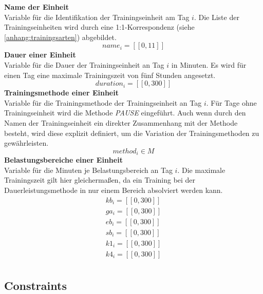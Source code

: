 \textbf{Name der Einheit} \\[0.2em]
Variable für die Identifikation der Trainingseinheit am Tag $i$. Die Liste der Trainingseinheiten wird durch eine 1:1-Korrespondenz (siehe \ref{anhang:trainingsarten}) abgebildet.
\begin{equation}
    name_i = [\![0, 11]\!]
\end{equation}
\textbf{Dauer einer Einheit} \\[0.2em]
Variable für die Dauer der Trainingseinheit an Tag $i$ in Minuten. Es wird für einen Tag eine maximale Trainingszeit von fünf Stunden angesetzt.
\begin{equation} 
    duration_i = [\![0, 300]\!] \end{equation} 
\textbf{Trainingsmethode einer Einheit} \\[0.2em]
Variable für die Trainingsmethode der Trainingseinheit an Tag $i$. Für Tage ohne Trainingseinheit wird die Methode \textit{PAUSE} eingeführt. Auch wenn durch den Namen der Trainingseinheit ein direkter Zusammenhang mit der Methode besteht, wird diese explizit definiert, um die Variation der Trainingsmethoden zu gewährleisten.
\begin{equation}
    method_i \in M
\end{equation} 
\textbf{Belastungsbereiche einer Einheit} \\[0.2em]
Variable für die Minuten je Belastungsbereich an Tag $i$. Die maximale Trainingszeit gilt hier gleichermaßen, da ein Training bei der Dauerleistungsmethode in nur einem Bereich absolviert werden kann. \newline
\begin{equation} 
\begin{array}{c}
    kb_i = [\![0, 300]\!] \\
    ga_i = [\![0, 300]\!] \\
    eb_i = [\![0, 300]\!] \\
    sb_i = [\![0, 300]\!] \\
    k1_i = [\![0, 300]\!] \\
    k4_i = [\![0, 300]\!] \\
\end{array}
\end{equation} 
\subsection{Constraints}
